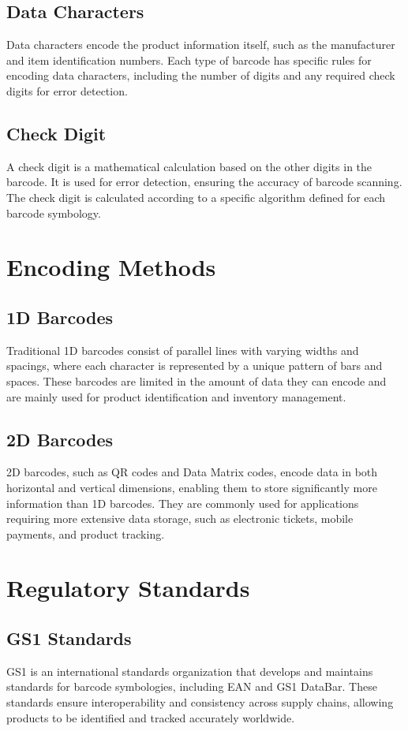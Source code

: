 \subsection{Data Characters}
Data characters encode the product information itself, such as the manufacturer and item identification numbers. Each type of barcode has specific rules for encoding data characters, including the number of digits and any required check digits for error detection.

\subsection{Check Digit}
A check digit is a mathematical calculation based on the other digits in the barcode. It is used for error detection, ensuring the accuracy of barcode scanning. The check digit is calculated according to a specific algorithm defined for each barcode symbology.

\section{Encoding Methods}

\subsection{1D Barcodes}
Traditional 1D barcodes consist of parallel lines with varying widths and spacings, where each character is represented by a unique pattern of bars and spaces. These barcodes are limited in the amount of data they can encode and are mainly used for product identification and inventory management.

\subsection{2D Barcodes}
2D barcodes, such as QR codes and Data Matrix codes, encode data in both horizontal and vertical dimensions, enabling them to store significantly more information than 1D barcodes. They are commonly used for applications requiring more extensive data storage, such as electronic tickets, mobile payments, and product tracking.

\section{Regulatory Standards}

\subsection{GS1 Standards}
GS1 is an international standards organization that develops and maintains standards for barcode symbologies, including EAN and GS1 DataBar. These standards ensure interoperability and consistency across supply chains, allowing products to be identified and tracked accurately worldwide.


